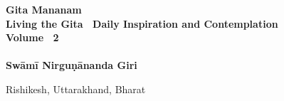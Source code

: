 \begin{titlepage}
    \begin{center}
        \vspace*{0.5cm}
            
        {\HUGE
        \textbf{\color{black}\fontsize{40}{60}\arialUC Gita Mananam}}
        \vspace{0.5cm}
        \textbf{\\ \arialUC \color{black}Living the Gita \textemdash \ Daily Inspiration and Contemplation}\\ 
		\vspace{1.0cm}
		\textbf{{\large \arialUC\color{black} Volume \textemdash \ 2}\\}\\		
        \vspace{6.0cm}
        \textbf{{\Large \color{black}\arialUC Swāmī  Nirguṇānanda Giri}}\\    
        
		
            
        \vfill
            
        
            
        \vspace{0.1cm}
        {\color{black}    
		
		{{\normalsize \arialUC\color{black} Rishikesh, Uttarakhand, Bharat}}
        }
    \end{center}
\end{titlepage}
\nopagecolor%